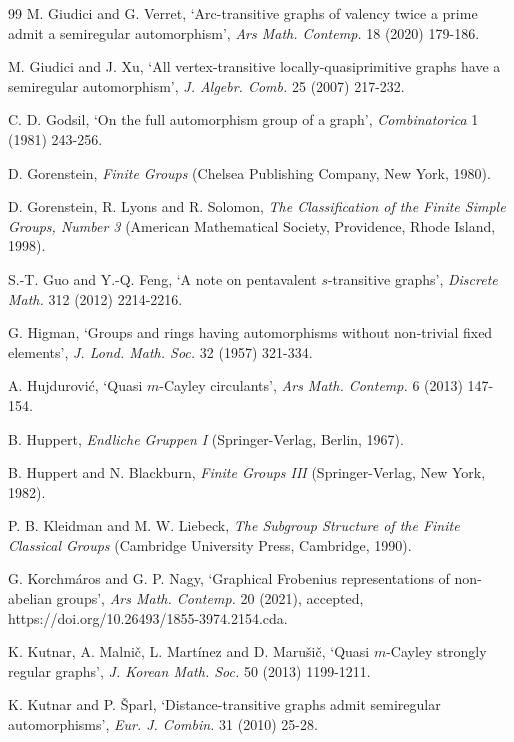 \documentclass[12pt,reqno]{amsart}
\numberwithin {equation} {section}
\begin{document}
\begin{thebibliography}{99}
 {\sc M. Giudici } and {\sc G. Verret}, `Arc-transitive graphs of valency twice a prime admit a semiregular automorphism', {\em Ars Math. Contemp.} 18 (2020) 179-186.

{\sc  M. Giudici } and {\sc J. Xu}, `All vertex-transitive locally-quasiprimitive graphs have a semiregular automorphism', {\em J. Algebr. Comb. }25 (2007) 217-232.

{\sc  C. D. Godsil}, `On the full automorphism group of a graph', {\em Combinatorica }1 (1981) 243-256.

{\sc D. Gorenstein},  {\em Finite Groups} (Chelsea Publishing Company, New York, 1980).

 {\sc D. Gorenstein, R. Lyons } and {\sc R. Solomon}, {\em The Classification of the Finite Simple Groups, Number 3} (American Mathematical Society, Providence, Rhode Island, 1998).


 {\sc S.-T. Guo } and {\sc Y.-Q. Feng}, `A note on pentavalent $s$-transitive graphs', {\em Discrete Math. }312 (2012) 2214-2216.


 {\sc G. Higman}, `Groups and rings having automorphisms without non-trivial fixed elements', {\em J. Lond. Math. Soc.} 32 (1957) 321-334.

  {\sc A. Hujdurovi\'{c}}, `Quasi $m$-Cayley circulants', {\em Ars Math. Contemp. }6 (2013) 147-154.

 {\sc B. Huppert},  {\em Endliche Gruppen I} (Springer-Verlag, Berlin, 1967).

 {\sc B. Huppert } and {\sc N. Blackburn}, {\em Finite Groups III} (Springer-Verlag, New York, 1982).


 {\sc P. B. Kleidman } and {\sc M. W. Liebeck}, {\em The Subgroup Structure of the Finite Classical Groups} (Cambridge University Press, Cambridge, 1990).



 {\sc G. Korchm\'{a}ros } and {\sc G. P. Nagy},   `Graphical Frobenius representations of non-abelian groups', {\em Ars Math. Contemp. }20 (2021), accepted, https://doi.org/10.26493/1855-3974.2154.cda.


 {\sc  K. Kutnar, A. Malni\v{c}, L. Mart\'{i}nez } and {\sc D. Maru\v{s}i\v{c}},  `Quasi $m$-Cayley strongly regular graphs', {\em J. Korean Math. Soc. }50 (2013) 1199-1211.

 {\sc  K. Kutnar } and {\sc P. \v{S}parl},   `Distance-transitive graphs admit semiregular automorphisms', {\em Eur. J. Combin. }31 (2010) 25-28.


\end{thebibliography}
\end{document}

